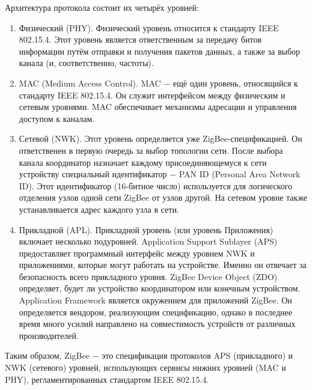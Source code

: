 	Архитектура протокола состоит их четырёх уровней:
	
	\begin{enumerate}
		\item Физический (PHY). Физический уровень относится к стандарту IEEE 802.15.4. Этот уровень
		является ответственным за передачу битов информации путём отправки и получения пакетов
		данных, а также за выбор канала (и, соответственно, частоты).
		\item MAC (Medium Access Control). MAC $-$ ещё один уровень, относящийся к стандарту IEEE 802.15.4.
		Он служит интерфейсом между физическим и сетевым уровнями. MAC обеспечивает механизмы
		адресации и управления доступом к каналам.
		\item Сетевой (NWK). Этот уровень определяется уже ZigBee-спецификацией. Он ответственен
		в первую очередь за выбор топологии сети. После выбора канала координатор назначает каждому
		присоединяющемуся к сети устройству специальный идентификатор $-$ PAN ID (Personal Area Network ID).
		Этот идентификатор (16-битное число) используется для логического отделения узлов одной сети 
		ZigBee от узлов другой. На сетевом уровне также устанавливается адрес каждого узла в сети.
		\item Прикладной (APL). Прикладной уровень (или уровень Приложения) включает несколько
		подуровней. Application Support Sublayer (APS) предоставляет программный интерфейс между 
		уровнем NWK и приложениями, которые могут работать на устройстве. Именно он отвечает за
		безопасность всего прикладного уровня. ZigBee Device Object (ZDO) определяет, будет ли устройство
		координатором или конечным устройством. Application Framework является окружением для
		приложений ZigBee. Он определяется вендором, реализующим спецификацию, однако в последнее
		время много усилий направлено на совместимость устройств от различных производителей.
	\end{enumerate}

	Таким образом, ZigBee $-$ это спецификация протоколов APS (прикладного) и NWK (сетевого) уровней,
	использующих сервисы нижних уровней (MAC и PHY), регламентированных стандартом IEEE 802.15.4. \newline
	
